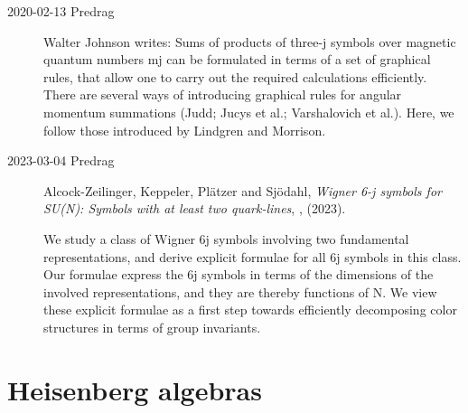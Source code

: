 \begin{description}
 \item[2020-02-13 Predrag]
  {Walter Johnson} writes:
Sums of products of three-j symbols over magnetic quantum numbers mj can
be formulated in terms of a set of graphical rules, that allow one to
carry out the required calculations efficiently. There are several ways
of introducing graphical rules for angular momentum summations
(Judd; Jucys et al.; Varshalovich et
al.). Here, we follow those introduced by Lindgren and
Morrison.

\item[2023-03-04 Predrag]
Alcock-Zeilinger, Keppeler, Pl{\"a}tzer and Sj{\"o}dahl,
{\em Wigner 6-j symbols for SU(N): {Symbols} with at least two quark-lines},
, (2023).

We study a class of  Wigner 6j symbols involving two fundamental
representations, and derive explicit formulae for all 6j symbols in this
class. Our formulae express the 6j symbols in terms of the dimensions of the
involved representations, and they are thereby functions of N. We view these
explicit formulae as a first step towards efficiently decomposing 
color structures in terms of group invariants.



\end{description}

\section{Heisenberg algebras}
\label{s-Heisenberg}

